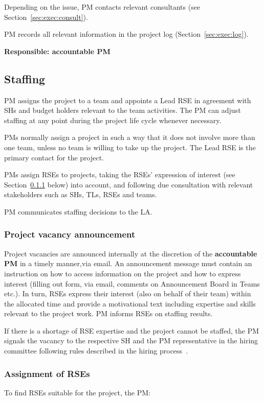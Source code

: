 \documentclass[11pt]{article}
\begin{document}
Depending on the issue, PM contacts relevant consultants (see Section~\ref{sec:exec:consult}).

PM records all relevant information in the project log (Section~\ref{sec:exec:log}).

\textbf{Responsible: accountable PM}



\subsection{Staffing}
PM assigns the project to a team and appoints a Lead RSE in agreement with SHs and budget
holders relevant to the team activities. The PM can adjust staffing at any point during the project life cycle
whenever necessary.

PMs normally assign a project in such a way that it does not involve more than one team, unless no team is willing to
take up the project. The Lead RSE is the primary contact for the project.

PMs assign RSEs to projects, taking the RSEs' expression of interest (see Section~\ref{sec:init:vacancy} below) into account, and following due consultation with relevant stakeholders such as SHs,
TLs, RSEs and teams. 

PM communicates staffing decisions to the LA. 

\subsubsection{Project vacancy announcement}
\label{sec:init:vacancy}
Project vacancies are announced internally at the discretion of the \textbf{accountable PM} in a timely manner,via email. An announcement message must contain an instruction on how to access information on the project and how to
express interest (filling out form, via email, comments on Announcement Board in Teams etc.). In turn, RSEs express
their interest (also on behalf of their team) within the allocated time and provide a motivational text including
expertise and skills relevant to the project work. PM informs RSEs on staffing results.

If there is a shortage of RSE expertise and the project cannot be staffed, the PM signals the vacancy to the respective
SH and the PM representative in the hiring committee following rules described in the hiring process~\cite{hiring-intranet}.


\subsubsection{Assignment of RSEs}
To find RSEs suitable for the project, the PM:
\end{document}
